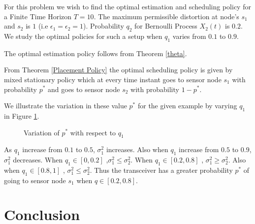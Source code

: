 \documentclass[a4paper,english,12pt]{article}
\begin{document}
For this problem we wish to find the optimal estimation and scheduling policy for a Finite Time Horizon $T=10$. The maximum permissible distortion at node's $s_1$ and $s_2$ is $1$ (i.e $\epsilon_1=\epsilon_2=1$). Probability $q_2$ for Bernoulli Process $X_2(t)$ is $0.2$. We study the optimal policies for such a setup when $q_1$
 varies from $0.1$ to $0.9$.
 
 The optimal estimation policy follows from Theorem \ref{theta}.

From Theorem \ref{Placement  Policy} the optimal scheduling policy is given by mixed stationary policy which at every time instant goes to sensor node $s_1$ with probability $p^*$ and goes to sensor node $s_2$ with probability $1-p^*$.

We illustrate the variation in these value $p^*$ for the given example by varying
 $q_1$ in Figure \ref{fig2}.
\begin{figure}[h]
	\centering
{}
\caption{Variation of $p^*$ with respect to $q_1$}
\label{fig2}
\end{figure}

As $q_1$ increase from $0.1$ to $0.5$, $\sigma_1^2$ increases. Also when  $q_1$ increase from $0.5$ to $0.9$, $\sigma_1^2$ decreases. 
When $q_1 \in[0, 0.2]$ ,$\sigma_1^2 \leq \sigma_2^2$.  When $q_1 \in[0.2, 0.8]$ , $\sigma_1^2 \geq \sigma_2^2$.
Also when $q_1 \in [0.8,1]$ , $\sigma_1^2 \leq \sigma_2^2$. Thus the transceiver has a greater probability $p^*$ of going to sensor node $s_1$ when $q \in [0.2, 0.8]$.
\section{Conclusion}
\end{document}
